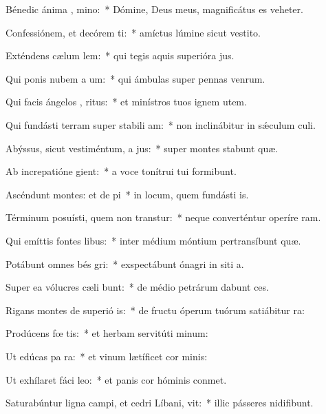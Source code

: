 \item Bénedic ánima , mino:~* Dómine, Deus meus, magnificátus es veheter.
\item Confessiónem, et decórem ti:~* amíctus lúmine sicut vestito.
\item Exténdens cælum  lem:~* qui tegis aquis superióra jus.
\item Qui ponis nubem a um:~* qui ámbulas super pennas venrum.
\item Qui facis ángelos , ritus:~* et minístros tuos ignem utem.
\item Qui fundásti terram super stabili am:~* non inclinábitur in sǽculum culi.
\item Abýssus, sicut vestiméntum, a jus:~* super montes stabunt quæ.
\item Ab increpatióne  gient:~* a voce tonítrui tui formibunt.
\item Ascéndunt montes: et de pi~* in locum, quem fundásti is.
\item Términum posuísti, quem non transtur:~* neque converténtur operíre ram.
\item Qui emíttis fontes  libus:~* inter médium móntium pertransíbunt quæ.
\item Potábunt omnes bés gri:~* exspectábunt ónagri in siti a.
\item Super ea vólucres cæli bunt:~* de médio petrárum dabunt ces.
\item Rigans montes de superió is:~* de fructu óperum tuórum satiábitur ra:
\item Prodúcens fœ tis:~* et herbam servitúti minum:
\item Ut edúcas pa  ra:~* et vinum lætíficet cor minis:
\item Ut exhílaret fáci  leo:~* et panis cor hóminis conmet.
\item Saturabúntur ligna campi, et cedri Líbani,  vit:~* illic pásseres nidifibunt.
